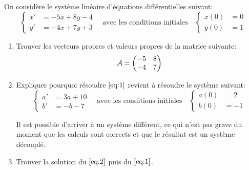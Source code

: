 \begin{td-exo}[] %
	On considère le système linéaire d'équations différentielles suivant:
	\begin{equation}\label{eq:1}
		\begin{cases}
			x'&=-5x+8y-4\\
			y'&=-4x+7y+3
		\end{cases}
		\quad\text{avec les conditions initiales}\quad
		\begin{cases}
			x(0)&=0\\
			y(0)&=1
		\end{cases}
	\end{equation}

	\begin{enumerate}
		\item Trouver les vecteurs propres et valeurs propres de la matrice suivante:
		\begin{equation*}
			\cal A=
			\begin{pmatrix}
				-5&8\\
				-4&7
			\end{pmatrix}
		\end{equation*}

		\item Expliquer pourquoi résoudre \(\eqref{eq:1}\) revient à résoudre le système
		suivant:
		\begin{equation}\label{eq:2}
			\begin{cases}
				a'&=3a+10\\
				b'&=-b-7
			\end{cases}
			\quad\text{avec les conditions initiales}\quad
			\begin{cases}
				a(0)&=2\\
				b(0)&=-1
			\end{cases}
		\end{equation}

		\begin{nnremark}[]
			Il est possible d'arriver à un système différent, ce qui n'est pas grave du
			moment que les calculs sont corrects et que le résultat est un système découplé.
		\end{nnremark}

		\item Trouver la solution du \(\eqref{eq:2}\) puis du \(\eqref{eq:1}\).
	\end{enumerate}
\end{td-exo}
